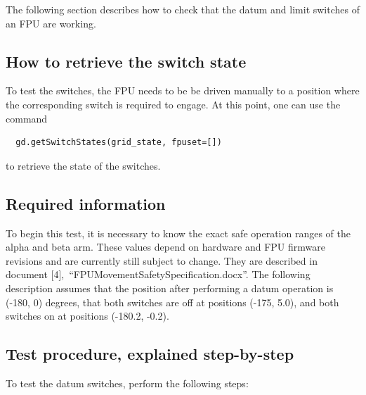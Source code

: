 \documentclass[11pt,a4paper]{report}
\begin{document}
The following section describes how to check that the datum and limit
switches of an FPU are working.

\subsection{How to retrieve the switch state}


To test the switches, the FPU needs to be be driven manually to a
position where the corresponding switch is required to engage. At this
point, one can use the command

\begin{verbatim}
  gd.getSwitchStates(grid_state, fpuset=[])
\end{verbatim}

to retrieve the state of the switches.


\subsection{Required information}

To begin this test, it is necessary to know the exact safe operation
ranges of the alpha and beta arm. These values depend on hardware and
FPU firmware revisions and are currently still subject to change.
They are described in document
[4],~``FPUMovementSafetySpecification.docx''.  The following
description assumes that the position after performing a datum
operation is (-180\degree, 0\degree) degrees, that both switches are off at
positions (-175\degree, 5.0\degree), and both switches on at positions (-180.2\degree,
-0.2\degree).

\subsection{Test procedure, explained step-by-step}
To test the datum switches, perform the following steps:
\end{document}
